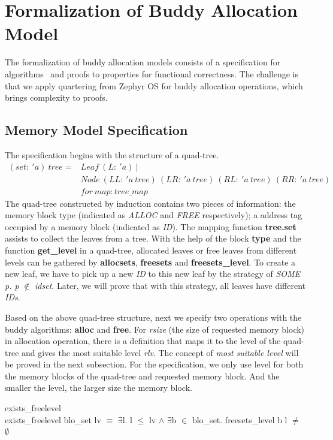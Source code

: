 \documentclass[runningheads]{llncs}
\begin{document}
\section{Formalization of Buddy Allocation Model}
The formalization of buddy allocation models consists of a specification for algorithms~\cite{reg_knowlton} and proofs to properties for functional correctness. The challenge is that we apply quartering from Zephyr OS for buddy allocation operations, which brings complexity to proofs.

\subsection{Memory Model Specification}
The specification begins with the structure of a quad-tree.
\begin{align*}
(set:\ 'a)\ tree = &Leaf\ (L:\ 'a)\ | \\
&Node\ (LL:\ 'a\ tree)\ (LR:\ 'a\ tree)\ (RL:\ 'a\ tree)\ (RR:\ 'a\ tree) \\
&for\ map: tree\_map
\end{align*}
The quad-tree constructed by induction contains two pieces of information: the memory block type (indicated as \textsl{ALLOC} and \textsl{FREE} respectively); a address tag occupied by a memory block (indicated as \textsl{ID}). The mapping function \textbf{tree.set} assists to collect the leaves from a tree. With the help of the block \textbf{type} and the function \textbf{get\_level} in a quad-tree, allocated leaves or free leaves from different levels can be gathered by \textbf{allocsets}, \textbf{freesets} and \textbf{freesets\_level}. To create a new leaf, we have to pick up a new \textsl{ID} to this new leaf by the strategy of \textsl{SOME p. p} $\notin$ \textsl{idset}. Later, we will prove that with this strategy, all leaves have different \textsl{IDs}.

Based on the above quad-tree structure, next we specify two operations with the buddy algorithms: \textbf{alloc} and \textbf{free}. For \textsl{rsize} (the size of requested memory block) in allocation operation, there is a definition that maps it to the level of the quad-tree and gives the most suitable level \textsl{rlv}. The concept of \textsl{most suitable level} will be proved in the next subsection. For the specification, we only use level for both the memory blocks of the quad-tree and requested memory block. And the smaller the level, the larger size the memory block.

\begin{definition} {exists\_freelevel} \\
exists\_freelevel blo\_set lv $\equiv$ $\exists$l. l $\leq$ lv $\wedge$ $\exists$b $\in$ blo\_set. freesets\_level b l $\ne$ $\emptyset$
\end{definition}
\end{document}
